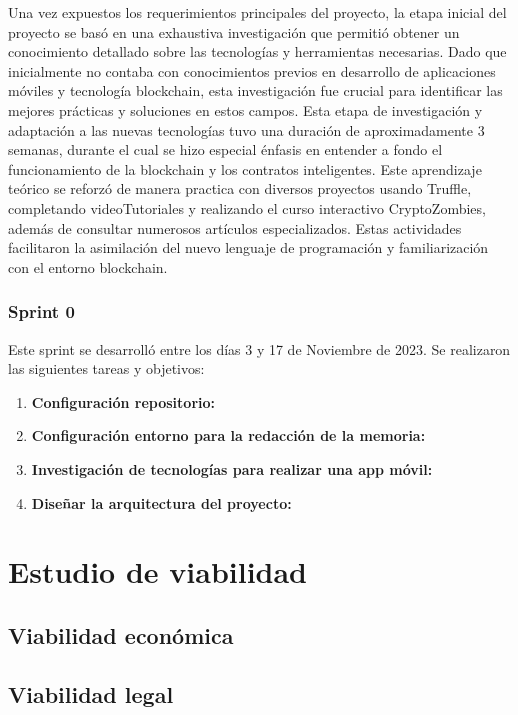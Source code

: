 Una vez expuestos los requerimientos principales del proyecto, la etapa inicial del proyecto se basó en una exhaustiva investigación que permitió obtener un conocimiento detallado sobre las tecnologías y herramientas necesarias. Dado que inicialmente no contaba con conocimientos previos en desarrollo de aplicaciones móviles y tecnología blockchain, esta investigación fue crucial para identificar las mejores prácticas y soluciones en estos campos. 
Esta etapa de investigación y adaptación a las nuevas tecnologías tuvo una duración de aproximadamente 3 semanas, durante el cual se hizo especial énfasis en entender a fondo el funcionamiento de la blockchain y los contratos inteligentes.
Este aprendizaje teórico se reforzó de manera practica con diversos proyectos usando Truffle, completando videoTutoriales y realizando el curso interactivo CryptoZombies, además de consultar numerosos artículos especializados. Estas actividades facilitaron la asimilación del nuevo lenguaje de programación y familiarización con el entorno blockchain.


\subsubsection{Sprint 0}

Este sprint se desarrolló entre los días 3 y 17 de Noviembre de 2023. Se realizaron las siguientes tareas y objetivos:

\begin{enumerate}

\item \textbf{Configuración repositorio:}

\item \textbf{Configuración entorno para la redacción de la memoria:}

\item \textbf{Investigación de tecnologías para realizar una app móvil:}

\item \textbf{Diseñar la arquitectura del proyecto:}

\end{enumerate}




\section{Estudio de viabilidad}

\subsection{Viabilidad económica}

\subsection{Viabilidad legal}


